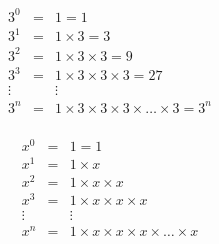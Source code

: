 \documentclass[12pt,letterpaper]{article}
\begin{document}
\begin{eqnarray*}
  3^0 & = & 1 = 1 \\
  3^1 & = & 1 \times 3 = 3\\
  3^2 & = & 1 \times 3 \times 3 = 9 \\
  3^3 & = & 1 \times 3 \times 3 \times 3 = 27 \\
  \vdots & & \vdots \\
  3^n & = & 1 \times 3 \times 3 \times 3 \times \ldots \times 3 = 3^n \\
\end{eqnarray*}

\begin{eqnarray*}
  x^0 & = & 1 = 1 \\
  x^1 & = & 1 \times x \\
  x^2 & = & 1 \times x \times x\\
  x^3 & = & 1 \times x \times x \times x \\
  \vdots & & \vdots \\
  x^n & = & 1 \times x \times x \times x \times \ldots \times x \\
\end{eqnarray*}
\end{document}

